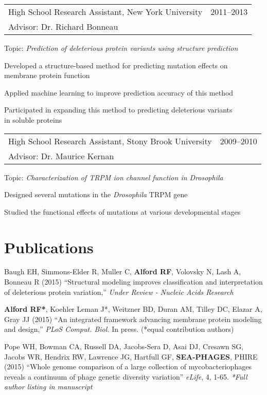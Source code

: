 \documentclass[12pt]{article}
\makeatletter
\newcommand{\allcapsspacing}[1]{{\addfontfeature{LetterSpace=7.5}#1}}
\newcommand{\researchitem}[4]{
\noindent
\begin{tabular*}{\textwidth}{@{\extracolsep{\fill}}lr}
		#1 & #2 \\
		#3 & \\
\end{tabular*}\newline#4\vspace{0.25\baselineskip}\par}
\makeatother
\begin{document}
\researchitem{High School Research Assistant, New York University}{2011--2013}{Advisor: Dr. Richard Bonneau}{Topic: \textit{Prediction of deleterious protein variants using structure prediction}}
\begin{compactitem}
\item Developed a structure-based method for predicting mutation effects on \\ membrane protein function
\item Applied machine learning to improve prediction accuracy of this method
\item Participated in expanding this method to predicting deleterious variants \\ in soluble proteins \\
\end{compactitem}

\researchitem{High School Research Assistant, Stony Brook University}{2009--2010}{Advisor: Dr. Maurice Kernan}{Topic: \textit{Characterization of TRPM ion channel function in Drosophila}}
\begin{compactitem}
\item Designed several mutations in the \textit{Drosophila} TRPM gene 
\item Studied the functional effects of mutations at various developmental stages \\
\end{compactitem}

\section*{\allcapsspacing{Publications}}

\begin{etaremune}
\item Baugh EH, Simmons-Elder R, Muller C, \textbf{Alford RF}, Volovsky N, Lash A, Bonneau R (2015) ``Structural modeling improves classification and interpretation of deleterious protein variation,'' \textit{Under Review - Nucleic Acids Research}

\item \textbf{Alford RF*}, Koehler Leman J*, Weitzner BD, Duran AM, Tilley DC, Elazar A, Gray JJ (2015) ``An integrated framework advancing membrane protein modeling and design,'' \textit{PLoS Comput. Biol.} In press. (*equal contribution authors)

\item Pope WH, Bowman CA, Russell DA, Jacobs-Sera D, Asai DJ, Cresawn SG, Jacobs WR, Hendrix RW, Lawrence JG, Hartfull GF, \textbf{SEA-PHAGES}, PHIRE (2015) ``Whole genome comparison of a large collection of mycobacteriophages reveals a continuum of phage genetic diversity variation'' \textit{eLife}, 4, 1-65. \textit{*Full author listing in manuscript}
\end{etaremune}
\end{document}
